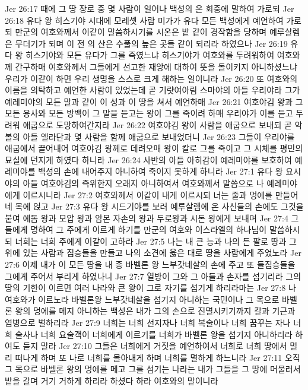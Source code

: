 Jer 26:17  때에 그 땅 장로 중 몇 사람이 일어나 백성의 온 회중에 말하여 가로되
Jer 26:18  유다 왕 히스기야 시대에 모레셋 사람 미가가 유다 모든 백성에게 예언하여 가로되 만군의 여호와께서 이같이 말씀하시기를 시온은 밭 같이 경작함을 당하며 예루살렘은 무더기가 되며 이 전 의 산은 수풀의 높은 곳들 같이 되리라 하였으나
Jer 26:19  유다 왕 히스기야와 모든 유다가 그를 죽였느냐 히스기야가 여호와를 두려워하여 여호와께 간구하매 여호와께서 그들에게 선고한 재앙에 대하여 뜻을 돌이키지 아니하셨느냐 우리가 이같이 하면 우리 생명을 스스로 크게 해하는 일이니라
Jer 26:20  또 여호와의 이름을 의탁하고 예언한 사람이 있었는데 곧 기럇여아림 스마야의 아들 우리야라 그가 예레미야의 모든 말과 같이 이 성과 이 땅을 쳐서 예언하매
Jer 26:21  여호야김 왕과 그 모든 용사와 모든 방백이 그 말을 듣고는 왕이 그를 죽이려 하매 우리야가 이를 듣고 두려워 애굽으로 도망하여간지라
Jer 26:22  여호야김 왕이 사람을 애굽으로 보내되 곧 악볼의 아들 엘라단과 몇 사람을 함께 애굽으로 보내었더니
Jer 26:23  그들이 우리야를 애굽에서 끌어내어 여호야김 왕께로 데려오매 왕이 칼로 그를 죽이고 그 시체를 평민의 묘실에 던지게 하였다 하니라
Jer 26:24  사반의 아들 아히감이 예레미야를 보호하여 예레미야를 백성의 손에 내어주지 아니하여 죽이지 못하게 하니라
Jer 27:1  유다 왕 요시야의 아들 여호야김의 즉위한지 오래지 아니하여서 여호와께서 말씀으로 나 예레미야에게 이르시니라
Jer 27:2  여호와께서 이같이 내게 이르시되 너는 줄과 멍에를 만들어 네 목에 얹고
Jer 27:3  유다 왕 시드기야를 보러 예루살렘에 온 사신들의 손에도 그것을 붙여 에돔 왕과 모압 왕과 암몬 자손의 왕과 두로왕과 시돈 왕에게 보내며
Jer 27:4  그들에게 명하여 그 주에게 이르게 하기를 만군의 여호와 이스라엘의 하나님이 말씀하시되 너희는 너희 주에게 이같이 고하라
Jer 27:5  나는 내 큰 능과 나의 든 팔로 땅과 그 위에 있는 사람과 짐승들을 만들고 나의 소견에 옳은 대로 땅을 사람에게 주었노라
Jer 27:6  이제 내가 이 모든 땅을 내 종 바벨론 왕 느부갓네살의 손에 주고 또 들짐승들을 그에게 주어서 부리게 하였나니
Jer 27:7  열방이 그와 그 아들과 손자를 섬기리라 그의 땅의 기한이 이르면 여러 나라와 큰 왕이 그로 자기를 섬기게 하리라마는
Jer 27:8  나 여호와가 이르노라 바벨론왕 느부갓네살을 섬기지 아니하는 국민이나 그 목으로 바벨론 왕의 멍에를 메지 아니하는 백성은 내가 그의 손으로 진멸시키기까지 칼과 기근과 염병으로 벌하리라
Jer 27:9  너희는 너희 선지자나 너희 복술이나 너희 꿈꾸는 자나 너희 술사나 너희 요술객이 너희에게 이르기를 너희가 바벨론 왕을 섬기지 아니하리라 하여도 듣지 말라
Jer 27:10  그들은 너희에게 거짓을 예언하여서 너희로 너희 땅에서 멀리 떠나게 하며 또 나로 너희를 몰아내게 하며 너희를 멸하게 하느니라
Jer 27:11  오직 그 목으로 바벨론 왕의 멍에를 메고 그를 섬기는 나라는 내가 그들을 그 땅에 머물러서 밭을 갈며 거기 거하게 하리라 하셨다 하라 여호와의 말이니라
